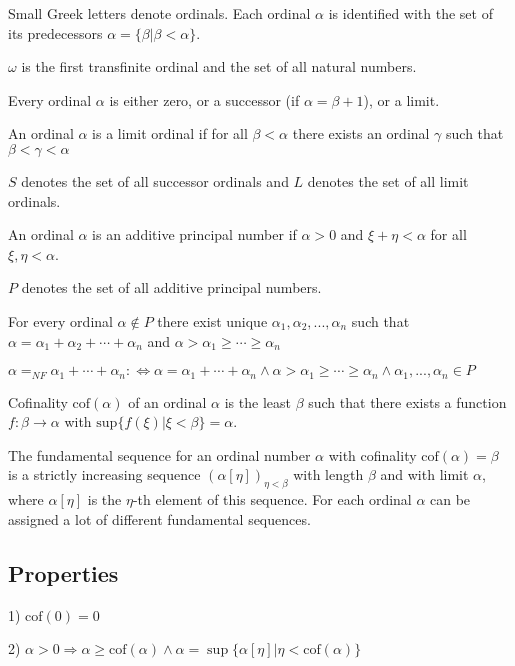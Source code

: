 \documentclass[10pt]{article}
\begin{document}
Small Greek letters denote ordinals. Each ordinal \(\alpha\) is identified with the set of its predecessors \(\alpha=\{\beta|\beta<\alpha\}\). 

\(\omega\) is the first transfinite ordinal and the set of all natural numbers.

Every ordinal \(\alpha\) is either zero, or a successor (if \(\alpha=\beta+1\)), or a limit.  

An ordinal \(\alpha\) is a limit ordinal if for all \(\beta<\alpha\) there exists an ordinal \(\gamma\) such that  \(\beta<\gamma<\alpha\)

\(S\) denotes the set of all successor ordinals and \(L\) denotes the set of all limit ordinals.

An ordinal \(\alpha\) is an additive principal number if \(\alpha>0\) and \(\xi+\eta<\alpha\) for all \(\xi,\eta<\alpha\). 

\(P\) denotes the set of all additive principal numbers.

For every ordinal \(\alpha\notin P\) there exist unique \(\alpha_1,\alpha_2,..., \alpha_n\) such that
\(\alpha=\alpha_1+\alpha_2+\cdots+\alpha_n\) and \(\alpha>\alpha _{1}\geq \cdots \geq \alpha _{n}\)

\(\alpha=_{NF}\alpha _{1}+\cdots +\alpha _{n}:\Leftrightarrow \alpha =\alpha _{1}+\cdots +\alpha _{n}\wedge \alpha>\alpha _{1}\geq \cdots \geq \alpha _{n}\wedge \alpha _{1},... ,\alpha _{n}\in P\)

Cofinality \(\text{cof}(\alpha)\) of an ordinal \(\alpha\) is the least \(\beta\) such that there exists a function \(f:\beta\rightarrow\alpha\) with \(\text{sup}\{f(\xi )|\xi <\beta \}=\alpha\). 

The fundamental sequence for an ordinal number \(\alpha\) with cofinality \(\text{cof}(\alpha)=\beta\) is a strictly increasing sequence \((\alpha[\eta])_{\eta<\beta}\) with length \(\beta\) and with limit \(\alpha\), where \(\alpha[\eta]\) is the \(\eta\)-th element of this sequence. For each ordinal \(\alpha\) can be assigned a lot of different fundamental sequences.

\subsection{Properties}

1) \(\text{cof}(0)=0\) 

2) \(\alpha>0 \Rightarrow \alpha\geq \text{cof}(\alpha) \wedge \alpha=\sup\{\alpha[\eta]|\eta<\text{cof}(\alpha)\}\) 
\end{document}

